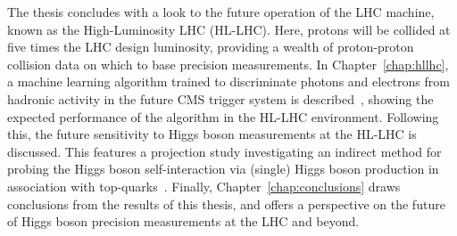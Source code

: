 The thesis concludes with a look to the future operation of the LHC machine, known as the High-Luminosity LHC (HL-LHC). Here, protons will be collided at five times the LHC design luminosity, providing a wealth of proton-proton collision data on which to base precision measurements. In Chapter~\ref{chap:hllhc}, a machine learning algorithm trained to discriminate photons and electrons from hadronic activity in the future CMS trigger system is described~\cite{CERN-LHCC-2020-004}, showing the expected performance of the algorithm in the HL-LHC environment. Following this, the future sensitivity to Higgs boson measurements at the HL-LHC is discussed. This features a projection study investigating an indirect method for probing the Higgs boson self-interaction via (single) Higgs boson production in association with top-quarks~\cite{CMS-PAS-FTR-18-020}. Finally, Chapter~\ref{chap:conclusions} draws conclusions from the results of this thesis, and offers a perspective on the future of Higgs boson precision measurements at the LHC and beyond.
